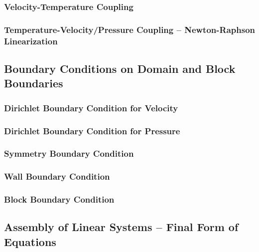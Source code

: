       \subsubsection{Velocity-Temperature Coupling}
      \subsubsection{Temperature-Velocity/Pressure Coupling -- Newton-Raphson Linearization}

    \subsection{Boundary Conditions on Domain and Block Boundaries}

      \subsubsection{Dirichlet Boundary Condition for Velocity}

      \subsubsection{Dirichlet Boundary Condition for Pressure}

      \subsubsection{Symmetry Boundary Condition}

      \subsubsection{Wall Boundary Condition}

      \subsubsection{Block Boundary Condition}

    \subsection{Assembly of Linear Systems -- Final Form of Equations}

